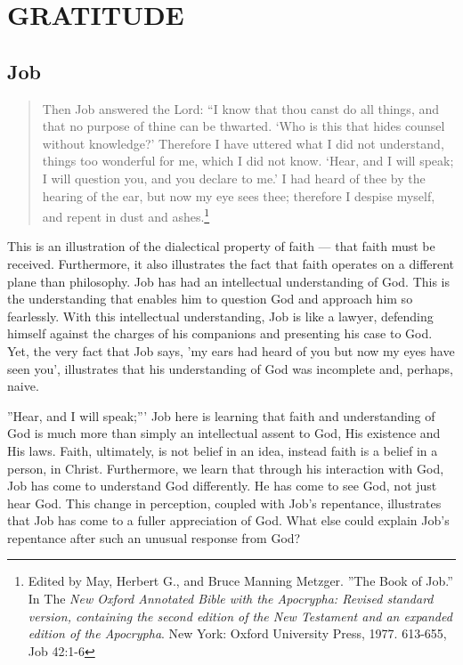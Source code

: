 \chapter{GRATITUDE}
	\section{Job}
\begin{quote}
\onehalfspacing
Then Job answered the Lord: ``I know that thou canst do all things, and that no purpose of thine can be thwarted. `Who is this that hides counsel without knowledge?' Therefore I have uttered what I did not understand, things too wonderful for me, which I did not know. `Hear, and I will speak; I will question you, and you declare to me.' I had heard of thee by the hearing of the ear, but now my eye sees thee; therefore I despise myself, and repent in dust and ashes.\footnote{Edited by May, Herbert G., and Bruce Manning Metzger. ''The Book of Job.'' In The \emph{New Oxford Annotated Bible with the Apocrypha: Revised standard version, containing the second edition of the New Testament and an expanded edition of the Apocrypha}. New York: Oxford University Press, 1977. 613-655, Job 42:1-6} 
\end{quote}


This is an illustration of the dialectical property of faith --- that faith must be received. Furthermore, it also illustrates the fact that faith operates on a different plane than philosophy. Job has had an intellectual understanding of God. This is the understanding that enables him to question God and approach him so fearlessly. With this intellectual understanding, Job is like a lawyer, defending himself against the charges of his companions and presenting his case to God. Yet, the very fact that Job says, 'my ears had heard of you but now my eyes have seen you', illustrates that his understanding of God was incomplete and, perhaps, naive.

''Hear, and I will speak;''' Job here is learning that faith and understanding of God is much more than simply an intellectual assent to God, His existence and His laws. Faith, ultimately, is not belief in an idea, instead faith is a belief in a person, in Christ. Furthermore, we learn that through his interaction with God, Job has come to understand God differently. He has come to see God, not just hear God. This change in perception, coupled with Job's repentance, illustrates that Job has come to a fuller appreciation of God. What else could explain Job's repentance after such an unusual response from God? 

